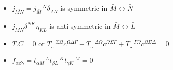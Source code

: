 \documentclass[11pt]{article}
\begin{document}
\begin{itemize}
\item $j_{\bar{MN}} = j_{\bar{M}}\,^{\bar{N}} \delta_{A\bar{N}}$ is symmetric in $\bar{M} \leftrightarrow \bar{N}$
\item $j_{\bar{MN}} \delta^{\bar{NK}} \eta_{\bar{KL}} $ is anti-symmetric in $\bar{M} \leftrightarrow \bar{L}$
\item $T.C = 0$ or $T_{..}\,^{\Sigma \Omega} c^{\Omega \Delta \Gamma} + T_{..}\,^{\Delta \Omega} c^{\Omega \Sigma  \Gamma} + T_{..}\,^{\Gamma \Omega} c^{\Omega \Sigma \Delta} = 0$
\item $f_{\alpha\beta\gamma} = t_{\alpha M}\,^{L} t_{\beta L}\,^{K} t_{\gamma K}\,^{M} = 0$
\end{itemize}


\end{document}
